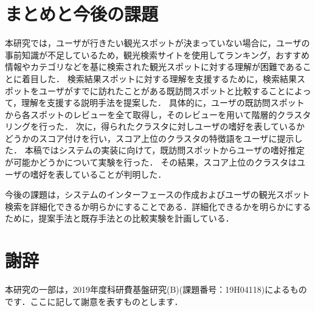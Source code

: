 \documentclass{deimj}
\begin{document}


\section{まとめと今後の課題}
\label{sec:まとめと今後の課題}

本研究では，ユーザが行きたい観光スポットが決まっていない場合に，ユーザの事前知識が不足しているため，観光検索サイトを使用してランキング，おすすめ情報やカテゴリなどを基に検索された観光スポットに対する理解が困難であることに着目した．
検索結果スポットに対する理解を支援するために，検索結果スポットをユーザがすでに訪れたことがある既訪問スポットと比較することによって，理解を支援する説明手法を提案した．
具体的に，ユーザの既訪問スポットから各スポットのレビューを全て取得し，そのレビューを用いて階層的クラスタリングを行った．
次に，得られたクラスタに対しユーザの嗜好を表しているかどうかのスコア付けを行い，スコア上位のクラスタの特徴語をユーザに提示した．
本稿ではシステムの実装に向けて，既訪問スポットからユーザの嗜好推定が可能かどうかについて実験を行った．
その結果，スコア上位のクラスタはユーザの嗜好を表していることが判明した．

今後の課題は，システムのインターフェースの作成およびユーザの観光スポット検索を詳細化できるか明らかにすることである．詳細化できるかを明らかにするために，提案手法と既存手法との比較実験を計画している．

\section*{謝辞}
本研究の一部は，2019年度科研費基盤研究(B)(課題番号：19H04118)によるものです．ここに記して謝意を表すものとします．
\end{document}
